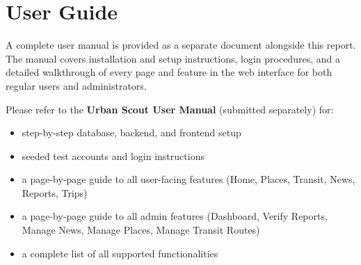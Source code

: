 \section{User Guide}

A complete user manual is provided as a separate document alongside this report. The manual covers installation and setup instructions, login procedures, and a detailed walkthrough of every page and feature in the web interface for both regular users and administrators.

Please refer to the \textbf{Urban Scout User Manual} (submitted separately) for:
\begin{itemize}
    \item step-by-step database, backend, and frontend setup
    \item seeded test accounts and login instructions
    \item a page-by-page guide to all user-facing features (Home, Places, Transit, News, Reports, Trips)
    \item a page-by-page guide to all admin features (Dashboard, Verify Reports, Manage News, Manage Places, Manage Transit Routes)
    \item a complete list of all supported functionalities
\end{itemize}
